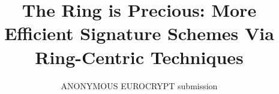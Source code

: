 \documentclass{llncs}
\title{The Ring is Precious: More Efficient Signature Schemes Via Ring-Centric Techniques}
\author{ANONYMOUS EUROCRYPT submission}
\begin{document}

\maketitle
\thispagestyle{empty}
\begin{abstract}
  


\end{abstract}


\clearpage
{} 



%





%
%




%
\end{document}
